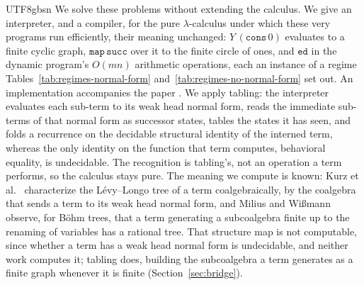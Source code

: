 \begin{CJK*}{UTF8}{gbsn}
  We solve these problems without extending the calculus. We give an interpreter, and a compiler, for the pure $\lambda$-calculus under which these very programs run efficiently, their meaning unchanged: $Y\,(\mathtt{cons}\,0)$ evaluates to a finite cyclic graph, $\mathtt{map}\,\mathtt{succ}$ over it to the finite circle of ones, and $\mathtt{ed}$ in the dynamic program's $O(mn)$ arithmetic operations, each an instance of a regime Tables~\ref{tab:regimes-normal-form} and~\ref{tab:regimes-no-normal-form} set out. An implementation accompanies the paper . We apply tabling: the interpreter evaluates each sub-term to its weak head normal form, reads the immediate sub-terms of that normal form as successor states, tables the states it has seen, and folds a recurrence on the decidable structural identity of the interned term, whereas the only identity on the function that term computes, behavioral equality, is undecidable. The recognition is tabling's, not an operation a term performs, so the calculus stays pure. The meaning we compute is known: Kurz et al.~\cite{kurz2013-nominal-coalgebraic-data-types} characterize the L\'evy--Longo tree of a term coalgebraically, by the coalgebra that sends a term to its weak head normal form, and Milius and Wi{\ss}mann~\cite{milius2015-finitary-corecursion} observe, for B\"ohm trees, that a term generating a subcoalgebra finite up to the renaming of variables has a rational tree. That structure map is not computable, since whether a term has a weak head normal form is undecidable, and neither work computes it; tabling does, building the subcoalgebra a term generates as a finite graph whenever it is finite (Section~\ref{sec:bridge}).
  \fi


\end{CJK*}
